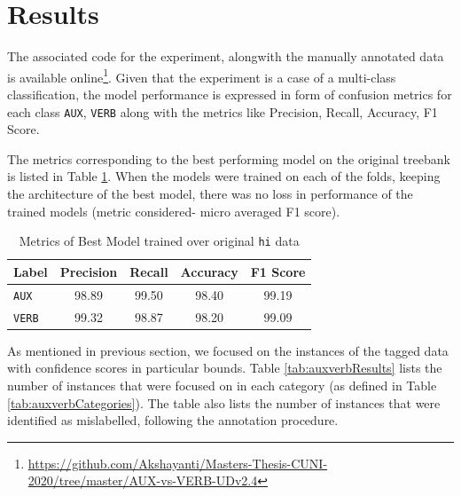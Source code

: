 \section{Results}
\label{ssec:auxverbResults}

The associated code for the experiment, alongwith the manually annotated data is available online\footnote{\url{https://github.com/Akshayanti/Masters-Thesis-CUNI-2020/tree/master/AUX-vs-VERB-UDv2.4}}. Given that the experiment is a case of a multi-class classification, the model performance is expressed in form of confusion metrics for each class \verb|AUX|, \verb|VERB| along with the metrics like Precision, Recall, Accuracy, F1 Score.

The metrics corresponding to the best performing model on the original treebank is listed in Table \ref{tab:auxverbBest}. When the models were trained on each of the folds, keeping the architecture of the best model, there was no loss in performance of the trained models (metric considered- micro averaged F1 score). 

\begin{table}[ht]
\centering
    \begin{tabular}{|l|c|c|c|c|}
        \hline
        \textbf{Label} & \textbf{Precision} & \textbf{Recall} & \textbf{Accuracy} & \textbf{F1 Score} \\
        \hline
        \verb|AUX| & 98.89 & 99.50 & 98.40 & 99.19 \\
        \verb|VERB| & 99.32 & 98.87 & 98.20 & 99.09 \\
        \hline
    \end{tabular}
\caption{Metrics of Best Model trained over original \texttt{hi} data}
\label{tab:auxverbBest}
\end{table}

As mentioned in previous section, we focused on the instances of the tagged data with confidence scores in particular bounds. Table \ref{tab:auxverbResults} lists the number of instances that were focused on in each category (as defined in Table \ref{tab:auxverbCategories}). The table also lists the number of instances that were identified as mislabelled, following the annotation procedure.

